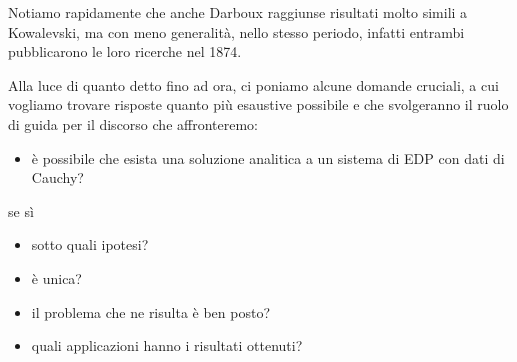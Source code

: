 Notiamo rapidamente che anche Darboux raggiunse risultati molto simili a Kowalevski, ma con meno generalità, nello stesso periodo, infatti entrambi pubblicarono le loro ricerche nel 1874.

Alla luce di quanto detto fino ad ora, ci poniamo alcune domande cruciali, a cui vogliamo trovare risposte quanto più esaustive possibile e che svolgeranno il ruolo di guida per il discorso che affronteremo:
\begin{itemize}
\item è possibile che esista una soluzione analitica a un sistema di EDP con dati di Cauchy?
\end{itemize}
se sì
\begin{itemize}
\item sotto quali ipotesi?
\item è unica?
\item il problema che ne risulta è ben posto?
\item quali applicazioni hanno i risultati ottenuti?
\end{itemize}



